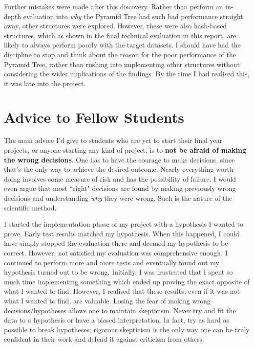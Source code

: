 Further mistakes were made after this discovery. Rather than perform an in-depth evaluation into \textit{why} the Pyramid Tree had such bad performance straight away, other structures were explored. However, these were also hash-based structures, which as shown in the final technical evaluation in this report, are likely to always perform poorly with the target datasets. I should have had the discipline to stop and think about the reason for the poor performance of the Pyramid Tree, rather than rushing into implementing other structures without considering the wider implications of the findings. By the time I had realised this, it was late into the project.

\section{Advice to Fellow Students}

The main advice I'd give to students who are yet to start their final year projects, or anyone starting any kind of project, is to \textbf{not be afraid of making the wrong decisions}. One has to have the courage to make decisions, since that's the only way to achieve the desired outcome. Nearly everything worth doing involves some measure of risk and has the possibility of failure. I would even argue that most ``right" decisions are found by making previously wrong decisions and understanding \textit{why} they were wrong. Such is the nature of the scientific method.

I started the implementation phase of my project with a hypothesis I wanted to prove. Early test results matched my hypothesis. When this happened, I could have simply stopped the evaluation there and deemed my hypothesis to be correct. However, not satisfied my evaluation was comprehensive enough, I continued to perform more and more tests and eventually found out my hypothesis turned out to be wrong. Initially, I was frustrated that I spent so much time implementing something which ended up proving the exact opposite of what I wanted to find. However, I realised that these results, even if it was not what I wanted to find, are valuable. Losing the fear of making wrong decisions/hypotheses allows one to maintain skepticism. Never try and fit the data to a hypothesis or have a biased interpretation. In fact, try as hard as possible to break hypotheses; rigorous skepticism is the only way one can be truly confident in their work and defend it against criticism from others.

